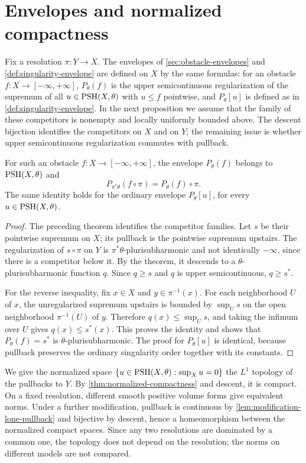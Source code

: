 \section{Envelopes and normalized compactness}

Fix a resolution $\pi\colon Y\to X$. The envelopes of \cref{sec:obstacle-envelopes} and \cref{def:singularity-envelope} are defined on $X$ by the same formulas: for an obstacle $f\colon X\to[-\infty,+\infty]$, $P_\theta(f)$ is the upper semicontinuous regularization of the supremum of all $u\in\mathrm{PSH}(X,\theta)$ with $u\leq f$ pointwise, and $P_\theta[u]$ is defined as in \cref{def:singularity-envelope}. In the next proposition we assume that the family of these competitors is nonempty and locally uniformly bounded above. The descent bijection identifies the competitors on $X$ and on $Y$; the remaining issue is whether upper semicontinuous regularization commutes with pullback.

\begin{proposition}\label{prop:space-envelope-pullback}
For such an obstacle $f\colon X\to[-\infty,+\infty]$, the envelope $P_\theta(f)$ belongs to $\mathrm{PSH}(X,\theta)$ and
\[
 P_{\pi^*\theta}(f\circ\pi)=P_\theta(f)\circ\pi.
\]
The same identity holds for the ordinary envelope $P_\theta[u]$, for every $u\in\mathrm{PSH}(X,\theta)$.
\end{proposition}
\begin{proof}
The preceding theorem identifies the competitor families. Let $s$ be their pointwise supremum on $X$; its pullback is the pointwise supremum upstairs. The regularization of $s\circ\pi$ on $Y$ is $\pi^*\theta$-plurisubharmonic and not identically $-\infty$, since there is a competitor below it. By the theorem, it descends to a $\theta$-plurisubharmonic function $q$. Since $q\geq s$ and $q$ is upper semicontinuous, $q\geq s^*$.

For the reverse inequality, fix $x\in X$ and $y\in\pi^{-1}(x)$. For each neighborhood $U$ of $x$, the unregularized supremum upstairs is bounded by $\sup_U s$ on the open neighborhood $\pi^{-1}(U)$ of $y$. Therefore $q(x)\leq\sup_U s$, and taking the infimum over $U$ gives $q(x)\leq s^*(x)$. This proves the identity and shows that $P_\theta(f)=s^*$ is $\theta$-plurisubharmonic. The proof for $P_\theta[u]$ is identical, because pullback preserves the ordinary singularity order together with its constants.
\end{proof}

We give the normalized space $\{u\in\mathrm{PSH}(X,\theta):\sup_Xu=0\}$ the $L^1$ topology of the pullbacks to $Y$. By \cref{thm:normalized-compactness} and descent, it is compact. On a fixed resolution, different smooth positive volume forms give equivalent norms. Under a further modification, pullback is continuous by \cref{lem:modification-lone-pullback} and bijective by descent, hence a homeomorphism between the normalized compact spaces. Since any two resolutions are dominated by a common one, the topology does not depend on the resolution; the norms on different models are not compared.

